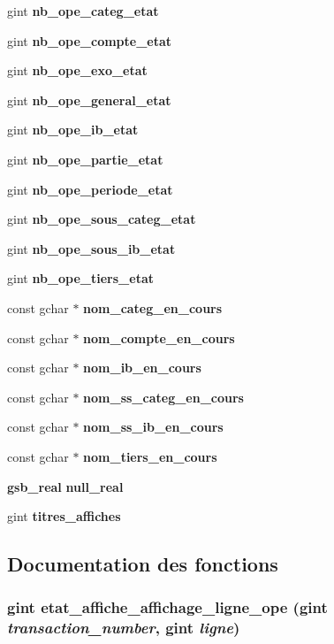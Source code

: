\begin{DoxyCompactItemize}
\item 
gint {\bf nb\_\-ope\_\-categ\_\-etat}
\item 
gint {\bf nb\_\-ope\_\-compte\_\-etat}
\item 
gint {\bf nb\_\-ope\_\-exo\_\-etat}
\item 
gint {\bf nb\_\-ope\_\-general\_\-etat}
\item 
gint {\bf nb\_\-ope\_\-ib\_\-etat}
\item 
gint {\bf nb\_\-ope\_\-partie\_\-etat}
\item 
gint {\bf nb\_\-ope\_\-periode\_\-etat}
\item 
gint {\bf nb\_\-ope\_\-sous\_\-categ\_\-etat}
\item 
gint {\bf nb\_\-ope\_\-sous\_\-ib\_\-etat}
\item 
gint {\bf nb\_\-ope\_\-tiers\_\-etat}
\item 
const gchar $\ast$ {\bf nom\_\-categ\_\-en\_\-cours}
\item 
const gchar $\ast$ {\bf nom\_\-compte\_\-en\_\-cours}
\item 
const gchar $\ast$ {\bf nom\_\-ib\_\-en\_\-cours}
\item 
const gchar $\ast$ {\bf nom\_\-ss\_\-categ\_\-en\_\-cours}
\item 
const gchar $\ast$ {\bf nom\_\-ss\_\-ib\_\-en\_\-cours}
\item 
const gchar $\ast$ {\bf nom\_\-tiers\_\-en\_\-cours}
\item 
{\bf gsb\_\-real} {\bf null\_\-real}
\item 
gint {\bf titres\_\-affiches}
\end{DoxyCompactItemize}


\subsection{Documentation des fonctions}
\subsubsection[{etat\_\-affiche\_\-affichage\_\-ligne\_\-ope}]{\setlength{\rightskip}{0pt plus 5cm}gint etat\_\-affiche\_\-affichage\_\-ligne\_\-ope (gint {\em transaction\_\-number}, \/  gint {\em ligne})}\label{etats__affiche_8c_ab00e4fcfeb69f01dd1447564693e1887}


